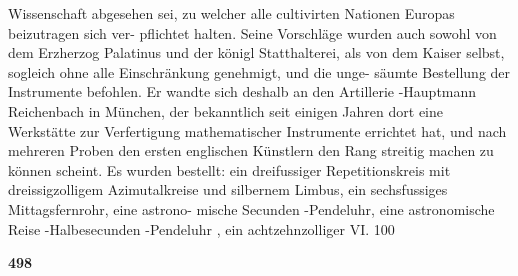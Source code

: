 \documentclass[12pt,a4paper]{article}
\begin{document}
Wissenschaft  abgesehen  sei,  zu  welcher  alle  cultivirten  Nationen  Europas  beizutragen  sich  ver- pflichtet halten.  Seine  Vorschläge  wurden  auch  sowohl  von  dem  Erzherzog  Palatinus  und  der  königl Statthalterei,  als  von  dem  Kaiser  selbst,  sogleich  ohne  alle  Einschränkung  genehmigt,  und  die  unge- säumte Bestellung  der  Instrumente  befohlen.  Er  wandte  sich  deshalb  an  den  Artillerie -Hauptmann Reichenbach  in  München,  der  bekanntlich  seit  einigen  Jahren  dort  eine  Werkstätte  zur  Verfertigung mathematischer  Instrumente  errichtet  hat,  und  nach  mehreren  Proben  den  ersten  englischen  Künstlern den  Rang  streitig  machen  zu  können  scheint.  Es  wurden  bestellt:  ein  dreifussiger  Repetitionskreis  mit dreissigzolligem  Azimutalkreise  und  silbernem  Limbus,  ein  sechsfussiges  Mittagsfernrohr,  eine  astrono- mische Secunden -Pendeluhr,  eine  astronomische  Reise -Halbesecunden -Pendeluhr ,   ein   achtzehnzolliger VI.  100

\vspace{0.5em}


\noindent\textbf{498}
\end{document}
